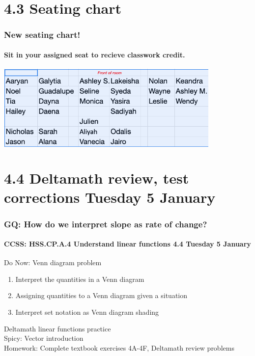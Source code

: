 \documentclass{beamer}
\begin{document}
\section{4.3 Seating chart}
\frame
{
  \frametitle{New seating chart!}
  \framesubtitle{Sit in your assigned seat to recieve classwork credit.}

\includegraphics[width=11cm]{IB-seating-chart.png}
}

\section{4.4 Deltamath review, test corrections Tuesday 5 January}
\frame
{
  \frametitle{GQ: How do we interpret slope as rate of change?}
  \framesubtitle{CCSS: HSS.CP.A.4 Understand linear functions \hfill \alert{4.4 Tuesday 5 January}}

  \begin{block}{Do Now: Venn diagram problem}
  \begin{enumerate}
    \item Interpret the quantities in a Venn diagram
    \item Assigning quantities to a Venn diagram given a situation
    \item Interpret set notation as Venn diagram shading
  \end{enumerate}
  \end{block}
  Deltamath linear functions practice \\ \bigskip
  Spicy: Vector introduction \\ \smallskip
  Homework: Complete textbook exercises 4A-4F, Deltamath review problems
}
\end{document}
